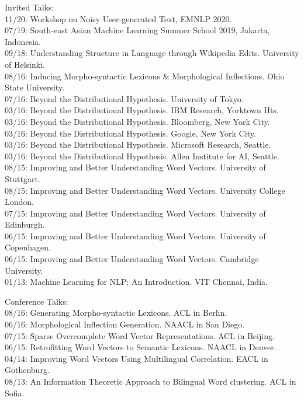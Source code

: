 \documentclass[margin,line]{res}
\begin{document}
\begin{resume}
\begin{hangparas}{.25in}{1}
Invited Talks:\\
11/20: Workshop on Noisy User-generated Text, EMNLP 2020.\\
07/19: South-east Asian Machine Learning Summer School 2019, Jakarta, Indonesia.\\
09/18: Understanding Structure in Language through Wikipedia Edits. University of Helsinki.\\
08/16: Inducing Morpho-syntactic Lexicons \& Morphological Inflections. Ohio State University.\\
07/16: Beyond the Distributional Hypothesis. University of Tokyo.\\
03/16: Beyond the Distributional Hypothesis. IBM Research, Yorktown Hts.\\
03/16: Beyond the Distributional Hypothesis. Bloomberg, New York City.\\
03/16: Beyond the Distributional Hypothesis. Google, New York City.\\
03/16: Beyond the Distributional Hypothesis. Microsoft Research, Seattle.\\
03/16: Beyond the Distributional Hypothesis. Allen Institute for AI, Seattle.\\
08/15: Improving and Better Understanding Word Vectors. University of Stuttgart.\\
08/15: Improving and Better Understanding Word Vectors. University College London.\\
07/15: Improving and Better Understanding Word Vectors. University of Edinburgh.\\
06/15: Improving and Better Understanding Word Vectors. University of Copenhagen.\\
06/15: Improving and Better Understanding Word Vectors. Cambridge University.\\
01/13: Machine Learning for NLP: An Introduction. VIT Chennai, India.

Conference Talks:\\
08/16: Generating Morpho-syntactic Lexicons. ACL in Berlin.\\
06/16: Morphological Inflection Generation. NAACL in San Diego.\\
07/15: Sparse Overcomplete Word Vector Representations. ACL in Beijing.\\
06/15: Retrofitting Word Vectors to Semantic Lexicons. NAACL in Denver.\\
04/14: Improving Word Vectors Using Multilingual Correlation. EACL in Gothenburg.\\
08/13: An Information Theoretic Approach to Bilingual Word clustering. ACL in Sofia.



\end{hangparas}
\end{resume}
\end{document}
